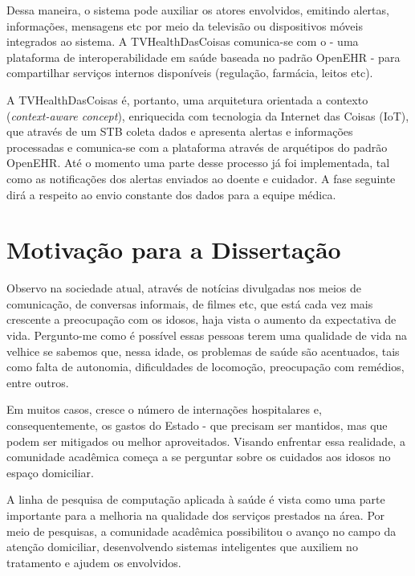 Dessa maneira, o sistema pode auxiliar os atores envolvidos, emitindo alertas,
informações, mensagens etc por meio da televisão ou dispositivos móveis
integrados ao sistema. A TVHealthDasCoisas comunica-se com o \nextsaude[] - uma
plataforma de interoperabilidade em saúde baseada no padrão OpenEHR - para
compartilhar serviços internos disponíveis (regulação, farmácia, leitos etc).

A TVHealthDasCoisas é, portanto, uma arquitetura orientada a contexto
(\textit{context-aware concept}), enriquecida com tecnologia da Internet das
Coisas (IoT), que através de um STB coleta dados e apresenta alertas e
informações processadas e comunica-se com a plataforma \nextsaude[] através de
arquétipos do padrão OpenEHR.  Até o momento uma parte desse processo já foi
implementada, tal como as notificações dos alertas enviados ao doente e
cuidador. A fase seguinte dirá a respeito ao envio constante dos dados para a
equipe médica.


\section{Motivação para a Dissertação}\label{sec:motivacao}

Observo na sociedade atual, através de notícias divulgadas nos meios
de comunicação, de conversas informais, de filmes etc, que está cada
vez mais crescente a preocupação com os idosos, haja vista o
aumento da expectativa de vida. Pergunto-me como é possível essas pessoas
terem uma qualidade de vida na velhice se sabemos que, nessa idade,
os problemas de saúde são acentuados, tais como falta de autonomia,
dificuldades de locomoção, preocupação com remédios, entre outros.

Em muitos casos, cresce o número de internações hospitalares e,
consequentemente, os gastos do Estado - que precisam ser mantidos, mas que
podem ser mitigados ou melhor aproveitados.  Visando enfrentar essa realidade,
a comunidade acadêmica começa a se perguntar sobre os cuidados aos idosos no
espaço domiciliar.

A linha de pesquisa de computação aplicada à saúde é vista como uma parte
importante para a melhoria na qualidade dos serviços prestados na área. Por meio
de pesquisas, a comunidade acadêmica possibilitou o avanço no campo da atenção
domiciliar, desenvolvendo sistemas inteligentes que auxiliem no tratamento e
ajudem os envolvidos.

